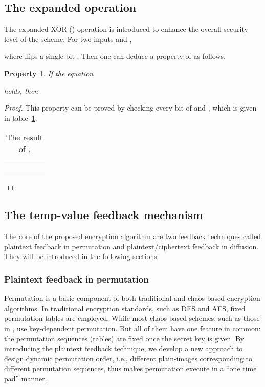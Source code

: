 \documentclass[3p,preprint,11pt]{elsarticle}
\newtheorem{property}{Property}
\begin{document}
\subsection{The expanded  operation}
The expanded XOR () operation is introduced to enhance the overall
security level of the scheme. For two inputs  and ,

where  flips a single bit .
Then one can deduce a property of  as follows.
\begin{property}
If the equation

holds, then

\label{pro:property}
\end{property}
\begin{proof}
This property can be proved by checking every bit of  and , which is given in
table~\ref{tab:eXORresult}.
\begin{table}[!htb]
\centering
\caption{The result of .}
\begin{tabular}{ p{2.4cm}  p{2.4cm}  p{2.4cm}  p{2.4cm}  p{2.4cm}}
\hline\multirow{2}{20pt}{}     & \multicolumn{4}{c}{} \\  \cline{2-5}
                                           &     &     &     &  \\
\hline                                   &      &      &     &  \\
\hline                                   &      &      &      & \\
\hline
\end{tabular}
\label{tab:eXORresult}
\end{table}

\end{proof}

\subsection{The temp-value feedback mechanism}
The core of the proposed encryption algorithm are two feedback techniques called
plaintext feedback in permutation and plaintext/ciphertext feedback in diffusion.
They will be introduced in the following sections.

\subsubsection{Plaintext feedback in permutation}
\label{sec:permutation}
Permutation is a basic component of both traditional and chaos-based encryption algorithms.
In traditional encryption standards, such as DES and AES, fixed permutation tables are employed.
While most chaos-based schemes, such as those in
\cite{Fridrich:ChaoticImageEncryption:IJBC98,Chen:3DChaoticCipher:CSF04,Mao:3Dbakermap:Optic2009,Zhang:ImageCrypt:SCSF07},
use key-dependent permutation. But all of them have one feature in common: the
permutation sequences (tables) are fixed once the secret key is given.
By introducing the plaintext feedback technique, we develop a new approach to design
dynamic permutation order, i.e., different plain-images corresponding to different permutation sequences,
thus makes permutation execute in a ``one time pad'' manner.
\end{document}
